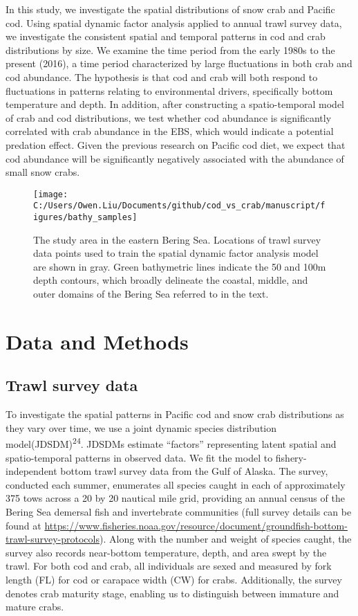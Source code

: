 \documentclass[11pt,]{article}
\begin{document}
In this study, we investigate the spatial distributions of snow crab and Pacific cod. Using spatial dynamic factor analysis applied to annual trawl survey data, we investigate the consistent spatial and temporal patterns in cod and crab distributions by size. We examine the time period from the early 1980s to the present (2016), a time period characterized by large fluctuations in both crab and cod abundance. The hypothesis is that cod and crab will both respond to fluctuations in patterns relating to environmental drivers, specifically bottom temperature and depth. In addition, after constructing a spatio-temporal model of crab and cod distributions, we test whether cod abundance is significantly correlated with crab abundance in the EBS, which would indicate a potential predation effect. Given the previous research on Pacific cod diet, we expect that cod abundance will be significantly negatively associated with the abundance of small snow crabs.

\begin{figure}
\texttt{[image: C:/Users/Owen.Liu/Documents/github/cod\_vs\_crab/manuscript/figures/bathy\_samples]} \caption{The study area in the eastern Bering Sea. Locations of trawl survey data points used to train the spatial dynamic factor analysis model are shown in gray. Green bathymetric lines indicate the 50 and 100m depth contours, which broadly delineate the coastal, middle, and outer domains of the Bering Sea referred to in the text.}\label{fig:bathy}
\end{figure}

\hypertarget{data-and-methods}{%
\section{Data and Methods}\label{data-and-methods}}

\hypertarget{trawl-survey-data}{%
\subsection{Trawl survey data}\label{trawl-survey-data}}

To investigate the spatial patterns in Pacific cod and snow crab distributions as they vary over time, we use a joint dynamic species distribution model(JDSDM)\textsuperscript{24}. JDSDMs estimate ``factors'' representing latent spatial and spatio-temporal patterns in observed data. We fit the model to fishery-independent bottom trawl survey data from the Gulf of Alaska. The survey, conducted each summer, enumerates all species caught in each of approximately 375 tows across a 20 by 20 nautical mile grid, providing an annual census of the Bering Sea demersal fish and invertebrate communities (full survey details can be found at \url{https://www.fisheries.noaa.gov/resource/document/groundfish-bottom-trawl-survey-protocols}). Along with the number and weight of species caught, the survey also records near-bottom temperature, depth, and area swept by the trawl. For both cod and crab, all individuals are sexed and measured by fork length (FL) for cod or carapace width (CW) for crabs. Additionally, the survey denotes crab maturity stage, enabling us to distinguish between immature and mature crabs.
\end{document}
